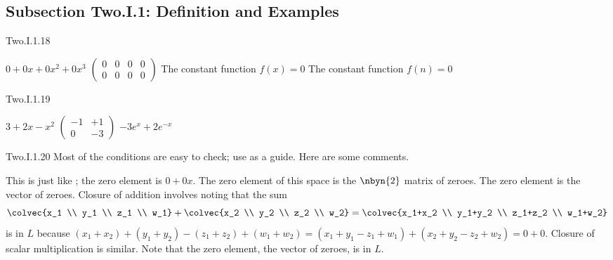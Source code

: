 \subsection{Subsection Two.I.1: Definition and Examples}
\begin{ans}{Two.I.1.18}
      \begin{exparts}
        \partsitem \( 0+0x+0x^2+0x^3 \)
        \partsitem \( \begin{pmatrix}
                   0  &0  &0  &0  \\
                   0  &0  &0  &0
                 \end{pmatrix} \)
        \partsitem The constant function \( f(x)=0 \)
        \partsitem The constant function \( f(n)=0 \)
      \end{exparts}
    
\end{ans}
\begin{ans}{Two.I.1.19}
      \begin{exparts*}
        \partsitem \( 3+2x-x^2 \)
        \partsitem \( \begin{pmatrix}
                   -1  &+1  \\
                    0  &-3
                 \end{pmatrix} \)
        \partsitem \( -3e^x+2e^{-x} \)
      \end{exparts*}
    
\end{ans}
\begin{ans}{Two.I.1.20}
      Most of the conditions are easy to check; use
       as a guide.
      Here are some comments.
      \begin{exparts}
        \partsitem This is just like ; the zero
          element is \( 0+0x \).
        \partsitem The zero element of this space is the $\nbyn{2}$
          matrix of zeroes.
        \partsitem The zero element is the vector of zeroes.
        \partsitem Closure of addition involves noting that the sum
          \begin{equation*}
            \colvec{x_1 \\ y_1 \\ z_1 \\ w_1}
            +\colvec{x_2 \\ y_2 \\ z_2 \\ w_2}
            =
            \colvec{x_1+x_2 \\ y_1+y_2 \\ z_1+z_2 \\ w_1+w_2}
          \end{equation*}
          is in \( L \) because
          \( (x_1+x_2)+(y_1+y_2)-(z_1+z_2)+(w_1+w_2)
          =(x_1+y_1-z_1+w_1)+(x_2+y_2-z_2+w_2)=0+0 \).
          Closure of scalar multiplication is similar.
          Note that the zero element, the vector of zeroes, is in $L$.
     \end{exparts}
     
\end{ans}
